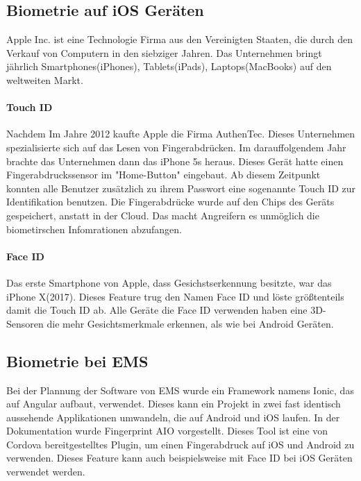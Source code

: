 \subsection{Biometrie auf iOS Geräten}
Apple Inc. ist eine Technologie Firma aus den Vereinigten Staaten, die durch den Verkauf von Computern in den siebziger Jahren. Das Unternehmen bringt jährlich Smartphones(iPhones), Tablets(iPads), Laptops(MacBooks) auf den weltweiten Markt.
\paragraph{Touch ID}
Nachdem 
Im Jahre 2012 kaufte Apple die Firma AuthenTec. Dieses Unternehmen spezialisierte sich auf das Lesen von Fingerabdrücken.
Im darauffolgendem Jahr brachte das Unternehmen dann das iPhone 5s heraus. Dieses Gerät hatte einen Fingerabdruckssensor im "Home-Button" eingebaut. Ab diesem Zeitpunkt konnten alle Benutzer zusätzlich zu ihrem Passwort eine sogenannte Touch ID zur Identifikation benutzen.
Die Fingerabdrücke wurde auf den Chips des Geräts gespeichert, anstatt in der Cloud. Das macht Angreifern es unmöglich die biometirschen Infomrationen abzufangen.
\paragraph{Face ID}
Das erste Smartphone von Apple, dass Gesichstserkennung besitzte, war das iPhone X(2017). Dieses Feature trug den Namen Face ID und löste größtenteils damit die Touch ID ab.
Alle Geräte die Face ID verwenden haben eine 3D-Sensoren die mehr Gesichtsmerkmale erkennen, als wie bei Android Geräten.


\subsection{Biometrie bei EMS}
Bei der Plannung der Software von EMS wurde ein Framework namens Ionic, das auf Angular aufbaut, verwendet. Dieses kann ein Projekt in zwei fast identisch aussehende Applikationen umwandeln, die auf Android und iOS laufen.
In der Dokumentation wurde Fingerprint AIO vorgestellt. Dieses Tool ist eine von Cordova bereitgestelltes Plugin, um einen Fingerabdruck auf iOS und Android zu verwenden.
Dieses Feature kann auch beispielsweise mit Face ID bei iOS Geräten verwendet werden.

